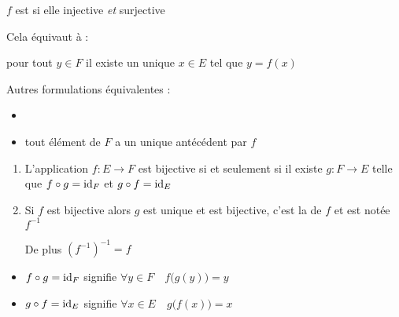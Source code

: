 \begin{frame}
\begin{mydefinition}
$f$ est  si elle injective \emph{et} surjective

\pause

Cela équivaut à :

pour tout $y \in F$ il existe un unique $x \in E$ tel que $y=f(x)$
\end{mydefinition}

\pause

Autres formulations équivalentes :
\begin{itemize}
  \item {}
\pause
  \item tout élément de $F$ a un unique antécédent par $f$
\end{itemize}

\pause


\end{frame}


\begin{frame}
\begin{proposition}
\label{prop:bij1}
\begin{enumerate}
  \item L'application $f : E \to F$ est bijective si et seulement si il existe $g : F \to E$
telle que $f \circ g = \mathop{\text{id}}\nolimits_F$ et $g \circ f = \mathop{\text{id}}\nolimits_E$

\pause

  \item Si $f$ est bijective alors $g$ est unique et est bijective,
c'est la  de $f$ et est notée $f^{-1}$

\pause

De plus $\left( f^{-1} \right)^{-1} = f$
\end{enumerate}
\end{proposition}

\pause
\bigskip

\begin{remarque}
\begin{itemize}
  \item $f \circ g = \mathop{\text{id}}\nolimits_F$ \qquad signifie \qquad  $\forall y \in F  \quad f\big(g(y)\big) = y$ \pause
  \item $g \circ f = \mathop{\text{id}}\nolimits_E$ \qquad signifie \qquad $\forall x \in E \quad g\big(f(x)\big) = x$ \pause
\end{itemize}

\end{remarque}
\end{frame}

